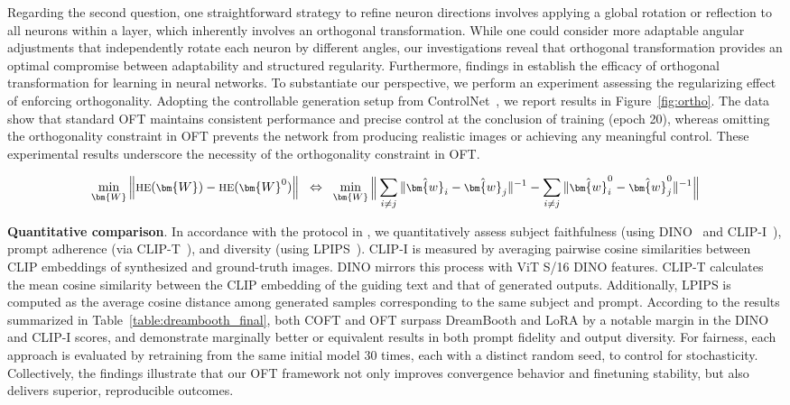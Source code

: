 Regarding the second question, one straightforward strategy to refine neuron directions involves applying a global rotation or reflection to all neurons within a layer, which inherently involves an orthogonal transformation. While one could consider more adaptable angular adjustments that independently rotate each neuron by different angles, our investigations reveal that orthogonal transformation provides an optimal compromise between adaptability and structured regularity. Furthermore, findings in \cite{liu2021orthogonal} establish the efficacy of orthogonal transformation for learning in neural networks. To substantiate our perspective, we perform an experiment assessing the regularizing effect of enforcing orthogonality. Adopting the controllable generation setup from ControlNet~\cite{zhang2023adding}, we report results in Figure~\ref{fig:ortho}. The data show that standard OFT maintains consistent performance and precise control at the conclusion of training (epoch 20), whereas omitting the orthogonality constraint in OFT prevents the network from producing realistic images or achieving any meaningful control. These experimental results underscore the necessity of the orthogonality constraint in OFT.

\begin{equation}\label{eq:oft_principle}
\footnotesize
\min_{\bm{W}} \left\| \text{HE}(\bm{W})-\text{HE}(\bm{W}^0)\right\|~~\Leftrightarrow~~\min_{\bm{W}} \bigg{\|} \sum_{i\neq j} \|\hat{\bm{w}}_i-\hat{\bm{w}}_j\|^{-1}-\sum_{i\neq j} \|\hat{\bm{w}}^0_i-\hat{\bm{w}}^0_j\|^{-1}\bigg{\|}
\end{equation}

\textbf{Quantitative comparison}. In accordance with the protocol in \cite{ruiz2023dreambooth}, we quantitatively assess subject faithfulness (using DINO~\cite{caron2021emerging} and CLIP-I~\cite{radford2021learning}), prompt adherence (via CLIP-T~\cite{radford2021learning}), and diversity (using LPIPS~\cite{zhang2018unreasonable}). CLIP-I is measured by averaging pairwise cosine similarities between CLIP embeddings of synthesized and ground-truth images. DINO mirrors this process with ViT S/16 DINO features. CLIP-T calculates the mean cosine similarity between the CLIP embedding of the guiding text and that of generated outputs. Additionally, LPIPS is computed as the average cosine distance among generated samples corresponding to the same subject and prompt. According to the results summarized in Table~\ref{table:dreambooth_final}, both COFT and OFT surpass DreamBooth and LoRA by a notable margin in the DINO and CLIP-I scores, and demonstrate marginally better or equivalent results in both prompt fidelity and output diversity. For fairness, each approach is evaluated by retraining from the same initial model 30 times, each with a distinct random seed, to control for stochasticity. Collectively, the findings illustrate that our OFT framework not only improves convergence behavior and finetuning stability, but also delivers superior, reproducible outcomes.

